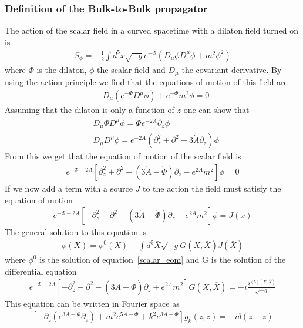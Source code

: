 \documentclass[12pt,a4paper]{article}
\begin{document}
\subsubsection{Definition of the Bulk-to-Bulk propagator}
The action of the scalar field in a curved spacetime with a dilaton field turned on is
\begin{align}
    S_\phi = - \frac{1}{2} \int d^5 x \sqrt{-g} e^{-\Phi} \left( D_\mu \phi D^\mu \phi + m^2 \phi^2 \right)
\end{align}
where $\Phi$ is the dilaton, $\phi$ the scalar field and $D_\mu$ the covariant derivative. By using the action principle we find that the equations of motion of this field are
\begin{align}
    - D_\mu \left( e^{-\Phi} D^\mu \phi \right) + e^{-\Phi}m^2 \phi = 0
\end{align}
Assuming that the dilaton is only a function of $z$ one can show that
\begin{align}
    & D_\mu \Phi D^\mu \phi = \dot{\Phi} e^{-2A} \partial_z \phi \\ 
    & D_\mu D^\mu \phi = e^{-2A} \left( \partial^2_z + \partial^2  + 3 \dot{A} \partial_z \right) \phi
\end{align}
From this we get that the equation of motion of the scalar field is
\begin{align}
    \label{scalar_eom}
    e^{-\Phi - 2 A} \left[ \partial^2_z + \partial^2 + \left( 3\dot{A} - \dot{\Phi} \right) \partial_z - e^{2A} m^2 \right] \phi = 0
\end{align}
If we now add a term with a source $J$ to the action the field must satisfy the equation of motion
\begin{align}
    e^{-\Phi - 2 A} \left[ - \partial^2_z - \partial^2 - \left( 3\dot{A} - \dot{\Phi} \right) \partial_z + e^{2A} m^2 \right] \phi = J \left(x\right)
\end{align}
The general solution to this equation is
\begin{align}
    \phi \left( X \right) = \phi^0 \left(X\right) + \int d^5 \bar{X} \sqrt{-\bar{g}} G\left(X,\bar{X}\right) J \left(\bar{X}\right)
\end{align}
where $\phi^0$ is the solution of equation~\ref{scalar_eom} and G is the solution of the differential equation
\begin{align}
    e^{-\Phi - 2 A} \left[- \partial^2_z - \partial^2 - \left( 3\dot{A} - \dot{\Phi} \right) \partial_z + e^{2A} m^2 \right] G\left(X,\bar{X}\right)  = -i \frac{\delta^{(5)\left(X,\bar{X}\right)}}{\sqrt{-g}}
\end{align}
This equation can be written in Fourier space as
\begin{align}
   \left[- \partial_z \left( e^{3 A - \Phi} \partial_z \right) + m^2 e^{5 A - \Phi} + k^2 e^{3 A - \Phi} \right] g_k \left(z, \bar{z}\right) = - i \delta \left( z -\bar{z} \right)
\end{align}
\end{document}
